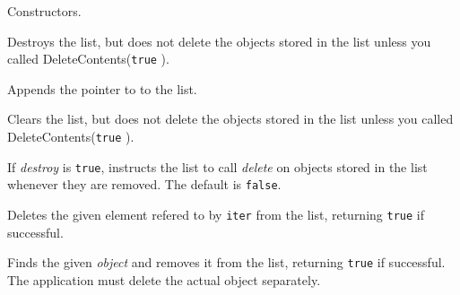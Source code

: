 \label{wxlistctor}



Constructors.

\label{wxlistdtor}


Destroys the list, but does not delete the objects stored in the list
unless you called DeleteContents({\tt true} ).

\label{wxlistappend}


Appends the pointer to  to the list.

\label{wxlistclear1}


Clears the list, but does not delete the objects stored in the list
unless you called DeleteContents({\tt true} ).

\label{wxlistdeletecontents}


If {\it destroy} is {\tt true}, instructs the list to call {\it delete}
on objects stored in the list whenever they are removed.
The default is {\tt false}.

\label{wxlistdeletenode}


Deletes the given element refered to by {\tt iter} from the list, 
returning {\tt true} if successful.

\label{wxlistdeleteobject}


Finds the given {\it object} and removes it from the list, returning
{\tt true} if successful. The application must delete the actual object
separately.

\label{wxlisterase}


